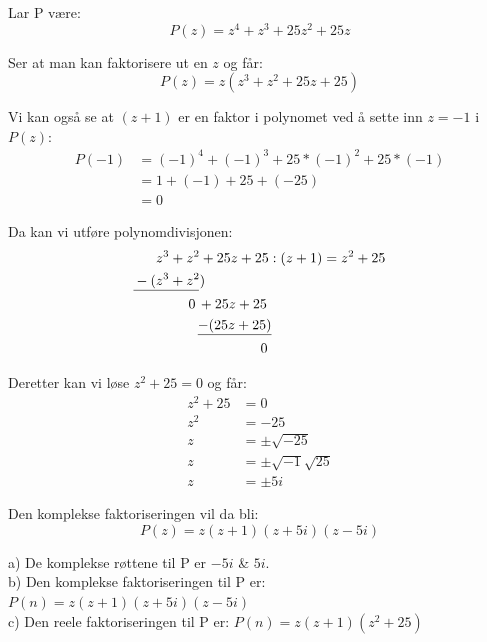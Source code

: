 \documentclass[12pt, a4paper]{article}
\begin{document}
\begin{flushleft}
Lar P være:
\begin{equation}
    P(z) = z^4 + z^3 + 25z^2 + 25z
\end{equation}
\newline

Ser at man kan faktorisere ut en $z$ og får:
\begin{equation}
    P(z) = z(z^3 + z^2 + 25z + 25)
\end{equation}
\newline

Vi kan også se at $(z + 1)$ er en faktor i polynomet ved å sette inn $z = -1$ i $P(z)$:
\begin{equation}
    \begin{split}
        P(-1) &= (-1)^4 + (-1)^3 + 25*(-1)^2 + 25*(-1) \\
              &= 1 + (-1) + 25 + (-25) \\
              &= 0
    \end{split}
\end{equation}
\newline

Da kan vi utføre polynomdivisjonen:
\begin{equation}
    \begin{split}
        &z^3 + z^2 + 25z + 25 : (z + 1) = z^2 + 25 \\
        \mathrlap{\underline{\phantom{-(z^3 + z^2)}}}-(&z^3 + z^2) \\
        &~~~~~~~0 \, + 25z + 25 \\
        &~~~~~~~~~ \mathrlap{\underline{-(25z + 25)}} \\
        &~~~~~~~~~~~~~~~~~~~~~~\,0
    \end{split}
\end{equation}
\newline

Deretter kan vi løse $z^2 + 25 = 0$ og får:
\begin{equation}
    \begin{split}
        z^2 + 25 &= 0 \\
        z^2 &= -25 \\
        z &= \pm \sqrt{-25} \\
        z &= \pm \sqrt{-1} \sqrt{25} \\
        z &= \pm 5i
    \end{split}
\end{equation}
\newline

Den komplekse faktoriseringen vil da bli:
\begin{equation}
    P(z) = z(z + 1)(z + 5i)(z - 5i)
\end{equation}
\newline\newline


    a) De komplekse røttene til P er $-5i$ \& $5i$. \\
    b) Den komplekse faktoriseringen til P er: $P(n) = z(z + 1)(z + 5i)(z - 5i)$ \\
    c) Den reele faktoriseringen til P er: $P(n) = z(z + 1)(z^2 + 25)$ 
\end{flushleft}
\newpage
\end{document}
